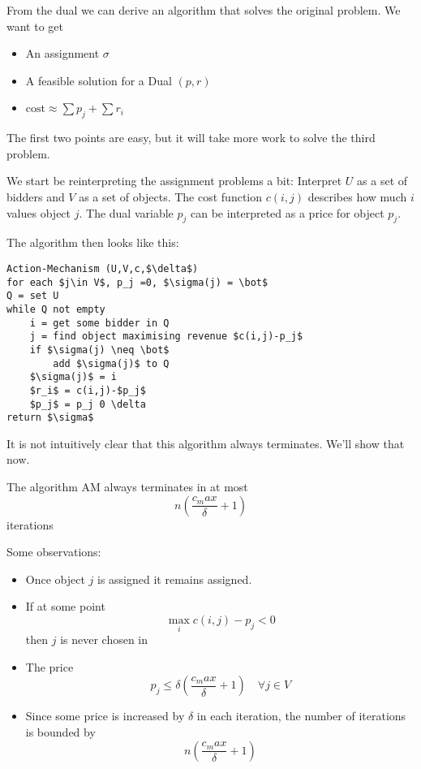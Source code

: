 From the dual we can derive an algorithm that solves the original problem. We want to get 

\begin{itemize}
\item An assignment $\sigma$
\item A feasible solution for a Dual $(p,r)$
\item $\text{cost} \approx \sum p_j + \sum r_i$
\end{itemize}

The first two points are easy, but it will take more work to solve the third problem.

We start be reinterpreting the assignment problems a bit: Interpret $U$ as a set of bidders and $V$ as a set of objects. The cost function $c(i,j)$ describes how much $i$ values object $j$. The dual variable $p_j$ can be interpreted as a price for object $p_j$.

The algorithm then looks like this:

\begin{lstlisting}
Action-Mechanism (U,V,c,$\delta$)
for each $j\in V$, p_j =0, $\sigma(j) = \bot$
Q = set U
while Q not empty
	i = get some bidder in Q
	j = find object maximising revenue $c(i,j)-p_j$
	if $\sigma(j) \neq \bot$
		add $\sigma(j)$ to Q
	$\sigma(j)$ = i
	$r_i$ = c(i,j)-$p_j$
	$p_j$ = p_j 0 \delta
return $\sigma$
\end{lstlisting}

It is not intuitively clear that this algorithm always terminates. We'll show that now.

\begin{lem} The algorithm AM always terminates in at most 
\[n\left(\frac {c_max}{\delta} +1\right)\]
iterations
\end{lem}

Some observations:

\begin{itemize}
\item Once object $j$ is assigned it remains assigned. 
\item If at some point 
\[\max_i c(i,j) - p_j <0\]
then $j$ is never chosen in %
\item The price 
\[p_j\leq \delta \left( \frac{c_max}{\delta} +1\right) \quad \forall j\in V\] %
\item Since some price is increased by $\delta$ in each iteration, the number of iterations is bounded by
\[n\left(\frac {c_max}{\delta} +1\right)\]
\end{itemize}

